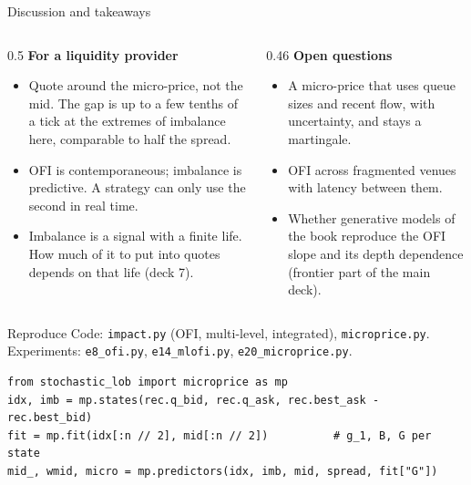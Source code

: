 \documentclass[aspectratio=169,10pt]{beamer}
\begin{document}
\begin{frame}{Discussion and takeaways}
  \small
  \begin{columns}[T]
    \begin{column}{0.5\textwidth}
      \textbf{For a liquidity provider}
      \begin{itemize}
        \item Quote around the micro-price, not the mid. The gap is up to a few tenths of a tick at the extremes of imbalance here, comparable to half the spread.
        \item OFI is contemporaneous; imbalance is predictive. A strategy can only use the second in real time.
        \item Imbalance is a signal with a finite life. How much of it to put into quotes depends on that life (deck 7).
      \end{itemize}
    \end{column}
    \begin{column}{0.46\textwidth}
      \textbf{Open questions}
      \begin{itemize}
        \item A micro-price that uses queue sizes and recent flow, with uncertainty, and stays a martingale.
        \item OFI across fragmented venues with latency between them.
        \item Whether generative models of the book reproduce the OFI slope and its depth dependence (frontier part of the main deck).
      \end{itemize}
    \end{column}
  \end{columns}
\end{frame}

\begin{frame}[fragile]{Reproduce}
  \small
  Code: \texttt{impact.py} (OFI, multi-level, integrated), \texttt{microprice.py}. Experiments: \texttt{e8\_ofi.py}, \texttt{e14\_mlofi.py}, \texttt{e20\_microprice.py}.
\begin{verbatim}
from stochastic_lob import microprice as mp
idx, imb = mp.states(rec.q_bid, rec.q_ask, rec.best_ask - rec.best_bid)
fit = mp.fit(idx[:n // 2], mid[:n // 2])          # g_1, B, G per state
mid_, wmid, micro = mp.predictors(idx, imb, mid, spread, fit["G"])
\end{verbatim}
\end{frame}

\deckreferences
\end{document}
